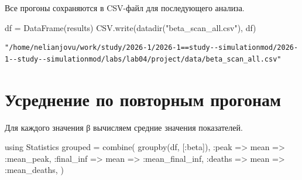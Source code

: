 \documentclass[
  12pt,
  a4paper,
  DIV=11,
  numbers=noendperiod]{scrreprt}
\newenvironment{Shaded}{\begin{snugshade}}{\end{snugshade}}
\newcommand{\BuiltInTok}[1]{\textcolor[rgb]{0.00,0.23,0.31}{#1}}
\newcommand{\FunctionTok}[1]{\textcolor[rgb]{0.28,0.35,0.67}{#1}}
\newcommand{\ImportTok}[1]{\textcolor[rgb]{0.00,0.46,0.62}{#1}}
\newcommand{\NormalTok}[1]{\textcolor[rgb]{0.00,0.23,0.31}{#1}}
\newcommand{\OperatorTok}[1]{\textcolor[rgb]{0.37,0.37,0.37}{#1}}
\newcommand{\StringTok}[1]{\textcolor[rgb]{0.13,0.47,0.30}{#1}}
\begin{document}
Все прогоны сохраняются в CSV-файл для последующего анализа.

\begin{Shaded}
\begin{Highlighting}[]
\NormalTok{df }\OperatorTok{=} \FunctionTok{DataFrame}\NormalTok{(results)}
\NormalTok{CSV.}\FunctionTok{write}\NormalTok{(}\FunctionTok{datadir}\NormalTok{(}\StringTok{"beta\_scan\_all.csv"}\NormalTok{), df)}
\end{Highlighting}
\end{Shaded}

\begin{verbatim}
"/home/nelianjovu/work/study/2026-1/2026-1==study--simulationmod/2026-1--study--simulationmod/labs/lab04/project/data/beta_scan_all.csv"
\end{verbatim}

\section{Усреднение по повторным
прогонам}\label{ux443ux441ux440ux435ux434ux43dux435ux43dux438ux435-ux43fux43e-ux43fux43eux432ux442ux43eux440ux43dux44bux43c-ux43fux440ux43eux433ux43eux43dux430ux43c-1}

Для каждого значения β вычисляем средние значения показателей.

\begin{Shaded}
\begin{Highlighting}[]
\ImportTok{using} \BuiltInTok{Statistics}
\NormalTok{grouped }\OperatorTok{=} \FunctionTok{combine}\NormalTok{(}
    \FunctionTok{groupby}\NormalTok{(df, [}\OperatorTok{:}\NormalTok{beta]),}
    \OperatorTok{:}\NormalTok{peak }\OperatorTok{=\textgreater{}}\NormalTok{ mean }\OperatorTok{=\textgreater{}} \OperatorTok{:}\NormalTok{mean\_peak,}
    \OperatorTok{:}\NormalTok{final\_inf }\OperatorTok{=\textgreater{}}\NormalTok{ mean }\OperatorTok{=\textgreater{}} \OperatorTok{:}\NormalTok{mean\_final\_inf,}
    \OperatorTok{:}\NormalTok{deaths }\OperatorTok{=\textgreater{}}\NormalTok{ mean }\OperatorTok{=\textgreater{}} \OperatorTok{:}\NormalTok{mean\_deaths,}
\NormalTok{)}
\end{Highlighting}
\end{Shaded}
\end{document}
